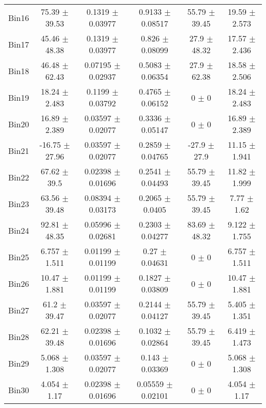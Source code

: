 \begin{tabular}{@{\extracolsep{4pt}}lccccc@{}}
     Bin16 & 75.39 $\pm$ 39.53 & 0.1319 $\pm$ 0.03977 & 0.9133 $\pm$ 0.08517 & 55.79 $\pm$ 39.45 & 19.59 $\pm$ 2.573 \\ 
     Bin17 & 45.46 $\pm$ 48.38 & 0.1319 $\pm$ 0.03977 & 0.826 $\pm$ 0.08099 & 27.9 $\pm$ 48.32 & 17.57 $\pm$ 2.436 \\ 
     Bin18 & 46.48 $\pm$ 62.43 & 0.07195 $\pm$ 0.02937 & 0.5083 $\pm$ 0.06354 & 27.9 $\pm$ 62.38 & 18.58 $\pm$ 2.506 \\ 
     Bin19 & 18.24 $\pm$ 2.483 & 0.1199 $\pm$ 0.03792 & 0.4765 $\pm$ 0.06152 & 0 $\pm$ 0 & 18.24 $\pm$ 2.483 \\ 
     Bin20 & 16.89 $\pm$ 2.389 & 0.03597 $\pm$ 0.02077 & 0.3336 $\pm$ 0.05147 & 0 $\pm$ 0 & 16.89 $\pm$ 2.389 \\ 
     Bin21 & -16.75 $\pm$ 27.96 & 0.03597 $\pm$ 0.02077 & 0.2859 $\pm$ 0.04765 & -27.9 $\pm$ 27.9 & 11.15 $\pm$ 1.941 \\ 
     Bin22 & 67.62 $\pm$ 39.5 & 0.02398 $\pm$ 0.01696 & 0.2541 $\pm$ 0.04493 & 55.79 $\pm$ 39.45 & 11.82 $\pm$ 1.999 \\ 
     Bin23 & 63.56 $\pm$ 39.48 & 0.08394 $\pm$ 0.03173 & 0.2065 $\pm$ 0.0405 & 55.79 $\pm$ 39.45 & 7.77 $\pm$ 1.62 \\ 
     Bin24 & 92.81 $\pm$ 48.35 & 0.05996 $\pm$ 0.02681 & 0.2303 $\pm$ 0.04277 & 83.69 $\pm$ 48.32 & 9.122 $\pm$ 1.755 \\ 
     Bin25 & 6.757 $\pm$ 1.511 & 0.01199 $\pm$ 0.01199 & 0.27 $\pm$ 0.04631 & 0 $\pm$ 0 & 6.757 $\pm$ 1.511 \\ 
     Bin26 & 10.47 $\pm$ 1.881 & 0.01199 $\pm$ 0.01199 & 0.1827 $\pm$ 0.03809 & 0 $\pm$ 0 & 10.47 $\pm$ 1.881 \\ 
     Bin27 & 61.2 $\pm$ 39.47 & 0.03597 $\pm$ 0.02077 & 0.2144 $\pm$ 0.04127 & 55.79 $\pm$ 39.45 & 5.405 $\pm$ 1.351 \\ 
     Bin28 & 62.21 $\pm$ 39.48 & 0.02398 $\pm$ 0.01696 & 0.1032 $\pm$ 0.02864 & 55.79 $\pm$ 39.45 & 6.419 $\pm$ 1.473 \\ 
     Bin29 & 5.068 $\pm$ 1.308 & 0.03597 $\pm$ 0.02077 & 0.143 $\pm$ 0.03369 & 0 $\pm$ 0 & 5.068 $\pm$ 1.308 \\ 
     Bin30 & 4.054 $\pm$ 1.17 & 0.02398 $\pm$ 0.01696 & 0.05559 $\pm$ 0.02101 & 0 $\pm$ 0 & 4.054 $\pm$ 1.17 \\ 
\hline\hline
  \end{tabular}
